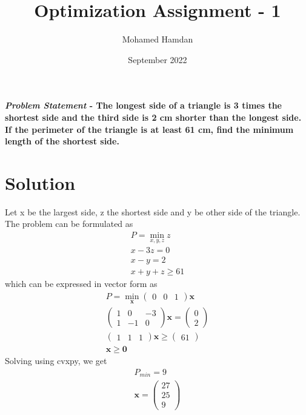 \documentclass[journal,10pt,twocolumn]{article}
\title{\textbf{Optimization Assignment - 1}}
\author{Mohamed Hamdan}
\date{September 2022}
\let\vec\mathbf
\newcommand{\myvec}[1]{\ensuremath{\begin{pmatrix}#1\end{pmatrix}}}
\begin{document}
\maketitle
\paragraph{\textit{Problem Statement} - The longest side of a triangle is 3 times the shortest side and the third side is 2 cm shorter than the longest side. If the perimeter of the triangle is at least 61 cm, find the minimum length of the shortest side.} 

\section*{\large Solution}
Let x be the largest side, z the shortest side and y be other side of the triangle. The problem can be formulated as
\begin{align}
	P = \min_{x,y,z}z\\
	x - 3z = 0\\
	x - y = 2\\
	x + y + z \geq 61
\end{align}
which can be expressed in vector form as
\begin{align}
	P = \min_{\vec{x}}\myvec{0&0&1}\vec{x}\\
	\myvec{1&0&-3\\1&-1&0}\vec{x} = \myvec{0\\2}\\
	\myvec{1&1&1}\vec{x} \geq \myvec{61}\\
	\vec{x} \geq \vec{0}
\end{align}
Solving using cvxpy, we get
\begin{align}
	P_{min} = 9\\
	\vec{x} = \myvec{27\\25\\9}
\end{align}
\end{document}
